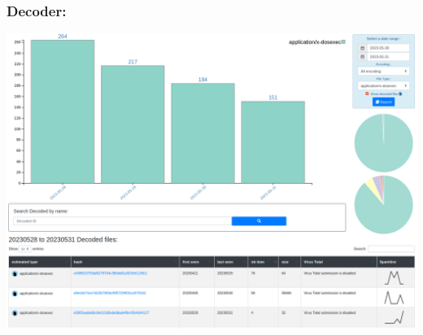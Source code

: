 \documentclass[10pt,aspectratio=169, colorlinks=true, linkcolor=circlBlue]{beamer}
\begin{document}
\begin{frame}
    \frametitle{Decoder:}
    \centerline{
        \includegraphics[scale=0.23]{screenshot/decodeds_dos.png}
    }
\end{frame}
\end{document}
